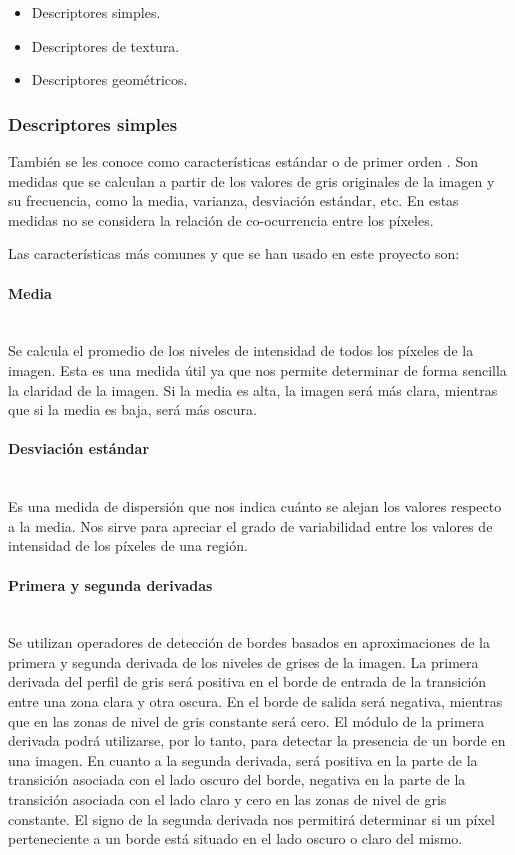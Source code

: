 \begin{itemize}
\item Descriptores simples.
\item Descriptores de textura.
\item Descriptores geométricos.
\end{itemize}

\subsubsection{Descriptores simples}
También se les conoce como características estándar o de primer orden \cite{presutti2004matriz}. Son medidas que se calculan a partir de los valores de gris originales de la imagen y su frecuencia, como la media, varianza, desviación estándar, etc. En estas medidas no se considera la relación de co-ocurrencia entre los píxeles.

Las características más comunes y que se han usado en este proyecto son:

\paragraph*{Media}\mbox{} \\
\indent Se calcula el promedio de los niveles de intensidad de todos los píxeles de la imagen. Esta es una medida útil ya que nos permite determinar de forma sencilla la claridad de la imagen. Si la media es alta, la imagen será más clara, mientras que si la media es baja, será más oscura.

\paragraph*{Desviación estándar}\mbox{} \\
\indent Es una medida de dispersión que nos indica cuánto se alejan los valores respecto a la media. Nos sirve para apreciar el grado de variabilidad entre los valores de intensidad de los píxeles de una región.

\paragraph*{Primera y segunda derivadas}\mbox{} \\
\indent Se utilizan operadores de detección de bordes \cite{marcosmartin2004} basados en aproximaciones de la primera y segunda derivada de los niveles de grises de la imagen. La primera derivada del perfil de gris será positiva en el borde de entrada de la transición entre una zona clara y otra oscura. En el borde de salida será negativa, mientras que en las zonas de nivel de gris constante será cero. El módulo de la primera derivada podrá utilizarse, por lo tanto, para detectar la presencia de un borde en una imagen. En cuanto a la segunda derivada, será positiva en la parte de la transición asociada con el lado oscuro del borde, negativa en la parte de la transición asociada con el lado claro y cero en las zonas de nivel de gris constante. El signo de la segunda derivada nos permitirá determinar si un píxel perteneciente a un borde está situado en el lado oscuro o claro del mismo.


